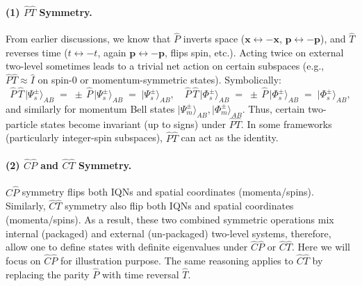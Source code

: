 \documentclass[12pt,a4paper]{article}
\begin{document}
\paragraph{(1) $\hat{P}\hat{T}$ Symmetry.}
From earlier discussions, we know that $\hat{P}$ inverts space ($\mathbf{x} \leftrightarrow -\mathbf{x}$, $\mathbf{p} \leftrightarrow -\mathbf{p}$), and $\hat{T}$ reverses time ($t \leftrightarrow -t$, again $\mathbf{p} \leftrightarrow -\mathbf{p}$, flips spin, etc.).
Acting twice on external two-level sometimes leads to a trivial net action on certain subspaces (e.g., $\hat{P}\hat{T} \approx \hat{I}$ on spin-0 or momentum-symmetric states).
Symbolically:
\[
\hat{P}\,\hat{T}\,\lvert \Psi_s^{\pm} \rangle_{AB} 
\;=\; \pm \,\hat{P}\,\lvert \Psi_s^{\pm} \rangle_{AB}
\;=\; \lvert \Psi_s^{\pm} \rangle_{AB},
\quad
\hat{P}\,\hat{T}\,\lvert \Phi_s^{\pm} \rangle_{AB}
\;=\;\pm \,\hat{P}\,\lvert \Phi_s^{\pm} \rangle_{AB}
\;=\;\lvert \Phi_s^{\pm} \rangle_{AB},
\]
and similarly for momentum Bell states $\lvert \Psi_m^{\pm} \rangle_{AB},\lvert \Phi_m^\pm\rangle_{AB}$.
Thus, certain two-particle states become invariant (up to signs) under $\hat{P}\hat{T}$.
In some frameworks (particularly integer-spin subspaces), $\hat{P}\hat{T}$ can act as the identity.


\paragraph{(2) $\hat{C}\hat{P}$ and $\hat{C}\hat{T}$ Symmetry.}
$\hat{C}\hat{P}$ symmetry flips both IQNs and spatial coordinates (momenta/spins).
Similarly, $\hat{C}\hat{T}$ symmetry also flip both IQNs and spatial coordinates (momenta/spins).
As a result, these two combined symmetric operations mix internal (packaged) and external (un-packaged) two-level systems, therefore, allow one to define states with definite eigenvalues under $\hat{C}\hat{P}$ or $\hat{C}\hat{T}$. 
Here we will focus on $\hat{C}\hat{P}$ for illustration purpose.
The same reasoning applies to $\hat{C}\hat{T}$ by replacing the parity $\hat{P}$ with time reversal $\hat{T}$.
\end{document}
